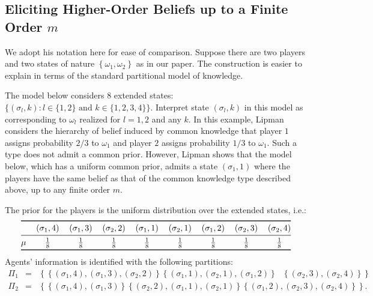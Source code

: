 \documentclass[12pt,reqno]{amsart}
\begin{document}
\subsection{Eliciting Higher-Order Beliefs up to a Finite Order \texorpdfstring{$m$}{m}}\label{sec:lipman}

We adopt his notation here for ease of comparison. Suppose there are two players and two states of nature $\left\{ \omega _{1},\omega _{2}\right\} $ as in our paper. The construction is easier to explain in terms of the standard partitional model of knowledge.  




The model below considers $8$ extended states: $\{\left(
\sigma_{l},k\right): l \in \{1,2\} \text{ and } k \in \{1,2,3,4\}\}$. Interpret state $(\sigma_l,k)$ in this model as corresponding to $\omega _{l}$ realized for $l=1,2$
and any $k$. In this example, Lipman considers the hierarchy of belief
induced by common knowledge that player $1$ assigns probability $2/3$ to $%
\omega _{1}$ and player $2$ assigns probability $1/3$ to $\omega _{1}$. Such
a type does not admit a common prior. However, Lipman shows that the model below, which has a uniform common prior, admits a state $\left(
\sigma_{1},1\right) $ where the players have the same belief as that of the common knowledge type described above, up to any finite order $m$.

The prior for the players is the uniform distribution over the extended states, i.e.: 
\[
\begin{tabular}{@{}lcccccccc@{}}
\toprule
& $\left( \sigma_{1},4\right) $ & $\left( \sigma_{1},3\right) $ & $\left(
\sigma_{2},2\right) $ & $\left( \sigma_{1},1\right) $ & $\left( \sigma_{2},1\right) $ & $%
\left( \sigma_{1},2\right) $ & $\left( \sigma_{2},3\right) $ & $\left( \sigma_{2},4\right) $
\\
\midrule
$\mu $ & $\frac{1}{8}$ & $\frac{1}{8}$ & $\frac{1}{8}$ & $\frac{1}{8}$ & $%
\frac{1}{8}$ & $\frac{1}{8}$ & $\frac{1}{8}$ & $\frac{1}{8}$ \\
\bottomrule
\end{tabular}%
\]
Agents' information is identified with the following partitions:
\begin{eqnarray*}
\Pi _{1} &=&\left\{ \left\{ \left( \sigma_{1},4\right) ,\left( \sigma_{1},3\right)
,\left( \sigma_{2},2\right) \right\} \left\{ \left( \sigma_{1},1\right) ,\left(
\sigma_{2},1\right) ,\left( \sigma_{1},2\right) \right\} \text{ }\left\{ \left(
\sigma_{2},3\right) ,\left( \sigma_{2},4\right) \right\} \right\} \\
\Pi _{2} &=&\left\{ \left\{ \left( \sigma_{1},4\right) ,\left( \sigma_{1},3\right)
\right\} \left\{ \left( \sigma_{2},2\right) ,\left( \sigma_{1},1\right) ,\left(
\sigma_{2},1\right) \right\} \left\{ \left( \sigma_{1},2\right) ,\left( \sigma_{2},3\right)
,\left( \sigma_{2},4\right) \right\} \right\} \text{.}
\end{eqnarray*}%
\end{document}
